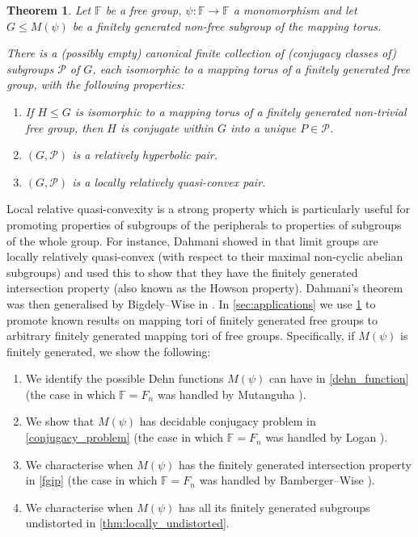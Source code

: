 \documentclass[11pt, a4paper]{amsart}
\newtheorem{theorem}{Theorem}[section]
\theoremstyle{definition}
\newcommand{\F}{\mathbb{F}}
\begin{document}
\begin{theorem}
\label{main}
Let $\F$ be a free group, $\psi\colon \F\to \F$ a monomorphism and let $G \leqslant M(\psi)$ be a finitely generated non-free subgroup of the mapping torus. 

There is a (possibly empty) canonical finite collection of (conjugacy classes of) subgroups $\mathcal{P}$ of $G$, each isomorphic to a mapping torus of a finitely generated free group, with the following properties:
\begin{enumerate}
\item If $H\leqslant G$ is isomorphic to a mapping torus of a finitely generated non-trivial free group, then $H$ is conjugate within $G$ into a unique $P\in\mathcal{P}$.
\item $(G, \mathcal{P})$ is a relatively hyperbolic pair.
\item $(G, \mathcal{P})$ is a locally relatively quasi-convex pair.
\end{enumerate}
\end{theorem}

Local relative quasi-convexity is a strong property which is particularly useful for promoting properties of subgroups of the peripherals to properties of subgroups of the whole group. For instance, Dahmani showed in \cite{Da03} that limit groups are locally relatively quasi-convex (with respect to their maximal non-cyclic abelian subgroups) and used this to show that they have the finitely generated intersection property (also known as the Howson property). Dahmani's theorem was then generalised by Bigdely--Wise in \cite{BW13}. In \cref{sec:applications} we use \cref{main} to promote known results on mapping tori of finitely generated free groups to arbitrary finitely generated mapping tori of free groups. Specifically, if $M(\psi)$ is finitely generated, we show the following:
\begin{enumerate}
\item We identify the possible Dehn functions $M(\psi)$ can have in \cref{dehn_function} (the case in which $\F = F_n$ was handled by Mutanguha \cite{Mu24}).
\item We show that $M(\psi)$ has decidable conjugacy problem in \cref{conjugacy_problem} (the case in which $\F = F_n$ was handled by Logan \cite{Lo23}).
\item We characterise when $M(\psi)$ has the finitely generated intersection property in \cref{fgip} (the case in which $\F = F_n$ was handled by Bamberger--Wise \cite{BW22}).
\item We characterise when $M(\psi)$ has all its finitely generated subgroups undistorted in \cref{thm:locally_undistorted}.
\end{enumerate}
\end{document}
